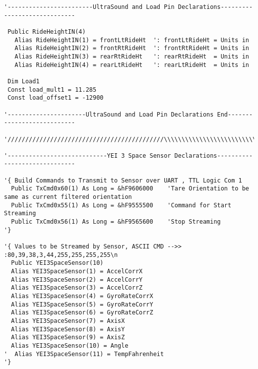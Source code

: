 \begin{lstlisting}[basicstyle=\tiny]
'------------------------UltraSound and Load Pin Declarations-----------------------------

 Public RideHeightIN(4)
   Alias RideHeightIN(1) = frontLtRideHt  ': frontLtRideHt = Units in
   Alias RideHeightIN(2) = frontRtRideHt  ': frontRtRideHt = Units in
   Alias RideHeightIN(3) = rearRtRideHt   ': rearRtRideHt  = Units in
   Alias RideHeightIN(4) = rearLtRideHt   ': rearLtRideHt  = Units in
 
 Dim Load1  
 Const load_mult1 = 11.285
 Const load_offset1 = -12900

'----------------------UltraSound and Load Pin Declarations End---------------------------

'////////////////////////////////////////////\\\\\\\\\\\\\\\\\\\\\\\\\\\\\\\\\\\\\\\\\\\\\
  
'----------------------------YEI 3 Space Sensor Declarations------------------------------
  
'{ Build Commands to Transmit to Sensor over UART , TTL Logic Com 1
  Public TxCmd0x60(1) As Long = &hF9606000    'Tare Orientation to be same as current filtered orientation
  Public TxCmd0x55(1) As Long = &hF9555500    'Command for Start Streaming
  Public TxCmd0x56(1) As Long = &hF9565600    'Stop Streaming
'}
  
'{ Values to be Streamed by Sensor, ASCII CMD -->> :80,39,38,3,44,255,255,255,255\n
  Public YEI3SpaceSensor(10)
  Alias YEI3SpaceSensor(1) = AccelCorrX
  Alias YEI3SpaceSensor(2) = AccelCorrY
  Alias YEI3SpaceSensor(3) = AccelCorrZ
  Alias YEI3SpaceSensor(4) = GyroRateCorrX
  Alias YEI3SpaceSensor(5) = GyroRateCorrY
  Alias YEI3SpaceSensor(6) = GyroRateCorrZ
  Alias YEI3SpaceSensor(7) = AxisX
  Alias YEI3SpaceSensor(8) = AxisY
  Alias YEI3SpaceSensor(9) = AxisZ
  Alias YEI3SpaceSensor(10) = Angle
'  Alias YEI3SpaceSensor(11) = TempFahrenheit
'}
  

\end{lstlisting}
